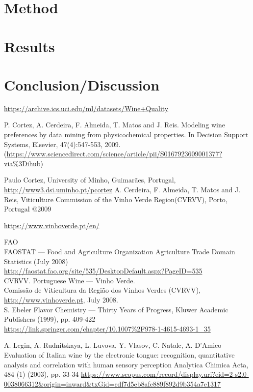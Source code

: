 \documentclass[12pt, letterpaper, twoside]{article}
\begin{document}
\section{Method}

\section{Results}
\section{Conclusion/Discussion}
\begin{thebibliography}{9}
\url{https://archive.ics.uci.edu/ml/datasets/Wine+Quality}

P. Cortez, A. Cerdeira, F. Almeida, T. Matos and J. Reis. Modeling wine preferences by data mining from physicochemical properties. In Decision Support Systems, Elsevier, 47(4):547-553, 2009. (\url{https://www.sciencedirect.com/science/article/pii/S0167923609001377?via%3Dihub})

Paulo Cortez, University of Minho, Guimarães, Portugal, \url{http://www3.dsi.uminho.pt/pcortez}
A. Cerdeira, F. Almeida, T. Matos and J. Reis, Viticulture Commission of the Vinho Verde Region(CVRVV), Porto, Portugal
@2009

\url{https://www.vinhoverde.pt/en/}

FAO\\
FAOSTAT — Food and Agriculture Organization Agriculture Trade Domain Statistics (July 2008)\\
\url{http://faostat.fao.org/site/535/DesktopDefault.aspx?PageID=535}\\

CVRVV. Portuguese Wine — Vinho Verde.\\
Comissão de Viticultura da Região dos Vinhos Verdes (CVRVV),\\ 
\url{http://www.vinhoverde.pt}, July 2008.\\

S. Ebeler
Flavor Chemistry — Thirty Years of Progress, Kluwer Academic Publishers (1999), pp. 409-422
\url{https://link.springer.com/chapter/10.1007%2F978-1-4615-4693-1_35}

A. Legin, A. Rudnitskaya, L. Luvova, Y. Vlasov, C. Natale, A. D'Amico
Evaluation of Italian wine by the electronic tongue: recognition, quantitative analysis and correlation with human sensory perception
Analytica Chimica Acta, 484 (1) (2003), pp. 33-34
\url{https://www.scopus.com/record/display.uri?eid=2-s2.0-0038066312&origin=inward&txGid=cdf7d5eb8afe889f892d9b354a7e1317}
\end{thebibliography}
\end{document}
